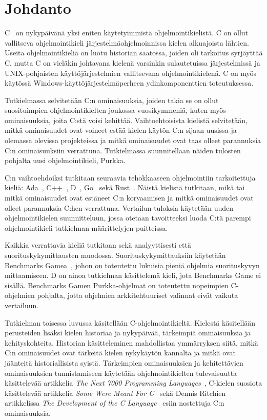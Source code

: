 \section{Johdanto}

C~\citep{C18} on nykypäivänä yksi eniten käytetyimmistä ohjelmointikielistä. C
on ollut vallitseva ohjelmointikieli järjestelmäohjelmoinnissa kielen
alkuajoista lähtien. Useita ohjelmointikieliä on luotu historian saatossa,
joiden oli tarkoitus syrjäyttää C, mutta C on vieläkin johtavana kielenä
varsinkin sulautetuissa järjestelmissä ja UNIX-pohjaisten käyttöjärjestelmien
vallitsevana ohjelmointikielenä. C on myös käytössä
Windows-käyttöjärjestelmäperheen ydinkomponenttien toteutuksessa.

Tutkielmassa selvitetään C:n ominaisuuksia, joiden takia se on ollut
suosituimpien ohjelmointikielten joukossa vuosikymmeniä, kuten myös
ominaisuuksia, joita C:stä voisi kehittää. Vaihtoehtoisista kielistä
selvitetään, mitkä ominaisuudet ovat voineet estää kielen käytön C:n sijaan
uusissa ja olemassa olevissa projekteissa ja mitkä ominaisuudet ovat taas
olleet parannuksia C:n ominaisuuksiin verrattuna. Tutkielmassa suunnitellaan
näiden tulosten pohjalta uusi ohjelmointikieli, Purkka.

C:n vaihtoehdoiksi tutkitaan seuraavia tehokkaaseen ohjelmointiin tarkoitettuja
kieliä: Ada~\citep{ADA12}, C++~\citep{CPP17}, D~\citep{D}, Go~\citep{golang}
sekä Rust~\citep{rust}. Näistä kielistä tutkitaan, mikä tai mitkä ominaisuudet
ovat estäneet C:n korvaamisen ja mitkä ominaisuudet ovat olleet parannuksia
C:hen verrattuna. Vertailun tuloksia käytetään uuden ohjelmointikielen
suunnitteluun, jossa otetaan tavoitteeksi luoda C:tä parempi ohjelmointikieli
tutkielman määrittelyjen puitteissa.

Kaikkia verrattavia kieliä tutkitaan sekä analyyttisesti että
suorituskykymittausten muodossa. Suorituskykymittauksiin käytetään Benchmarks
Gamea~\citep{benchmarks}, johon on toteutettu lukuisia pieniä ohjelmia
suorituskyvyn mittaamiseen. D on ainoa tutkielman käsittelemä kieli, jota
Benchmarks Game ei sisällä. Benchmarks Gamen Purkka-ohjelmat on toteutettu
nopeimpien C-ohjelmien pohjalta, jotta ohjelmien arkkitehtuuriset valinnat
eivät vaikuta vertailuun. 

Tutkielman toisessa luvussa käsitellään C-ohjelmointikieltä. Kielestä
käsitellään perusteiden lisäksi kielen historiaa ja nykypäivää, tärkeimpiä
ominaisuuksia ja kehityskohteita. Historian käsitteleminen mahdollistaa
ymmärryksen siitä, mitkä C:n ominaisuudet ovat tärkeitä kielen nykykäytön
kannalta ja mitkä ovat jäänteitä historiallisista syistä. Tärkeimpien
ominaisuuksien ja kehitettävien ominaisuuksien tunnistamiseen käytetään
ohjelmointikielten tulevaisuutta käsittelevää artikkelia \emph{The Next 7000
Programming Languages}~\citep{next7000}, C-kielen suosiota käsittelevää
artikkelia \emph{Some Were Meant For C}~\citep{somemeantforc} sekä Dennis
Ritchien artikkelissa \emph{The Development of the C Language}~\citep{chistory}
esiin nostettuja C:n ominaisuuksia.

